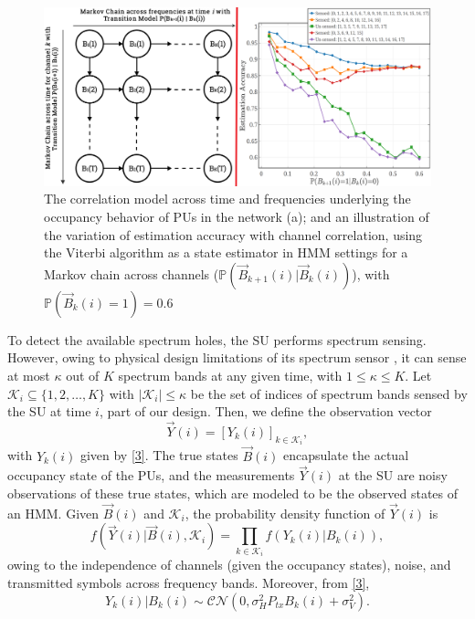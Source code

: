 \documentclass[10pt,twocolumn]{IEEEtran}
\begin{document}
\begin{figure} [t]
    \centering
    \includegraphics[width=1.0\linewidth]{System_Model_2.png}
    \caption{The correlation model across time and frequencies underlying the occupancy behavior of PUs in the network (a); and an illustration of the variation of estimation accuracy with channel correlation, using the Viterbi algorithm as a state estimator in HMM settings for a Markov chain across channels ($\mathbb{P}(\vec{B}_{k{+}1}(i){|}\vec{B}_{k}(i))$), with $\mathbb{P}(\vec{B}_{k}(i){=}1){=}0.6$}
    \label{fig:1}
    \vspace{-6mm}
\end{figure}

To detect the available spectrum holes, the SU performs spectrum sensing. However, owing to physical design limitations of its spectrum sensor \cite{5990482}, it can sense at most $\kappa$ out of $K$ spectrum bands at any given time, with $1{\leq}\kappa{\leq}K$. Let $\mathcal K_{i}{\subseteq}\{1,2,\dots,K\}$ with $|\mathcal K_i|{\leq}\kappa$ be the set of indices of spectrum bands sensed by the SU at time $i$, part of our design.
Then, we define the observation vector
\begin{equation}\label{8}
    \vec{Y}(i) = [Y_k(i)]_{k {\in} \mathcal K_i},
\end{equation}
with $Y_k(i)$ given by \eqref{3}.
The true states $\vec{B}(i)$ encapsulate the actual occupancy state of the PUs, and the measurements $\vec{Y}(i)$ at the SU are noisy observations of these true states, which are modeled to be the observed states of an HMM. Given $\vec{B}(i)$ and $\mathcal K_i$, the probability density function of $\vec{Y}(i)$ is
\begin{equation}\label{9}
    f(\vec{Y}(i)|\vec{B}(i), \mathcal K_i) = \prod_{k \in \mathcal K_i} f(Y_k(i)|B_k(i)),
\end{equation}
owing to the independence of channels (given the occupancy states), noise, and transmitted symbols across frequency bands. Moreover, from \eqref{3},
\begin{equation}\label{10}
 Y_k(i)|B_k(i) \sim \mathcal{CN}(0, \sigma_H^2P_{tx}B_k(i) + \sigma_V^2).
\end{equation}
\end{document}
